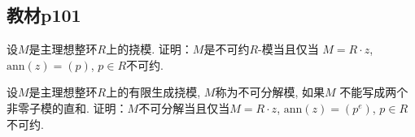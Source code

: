 \subsection{教材p101}

\begin{problem}
    设$M$是主理想整环$R$上的挠模. 证明：$M$是不可约$R$-模当且仅当
$M = R \cdot z$, $\mathrm{ann}(z) = (p)$, $p \in R$不可约.
\end{problem}

\begin{solution}
    
\end{solution}

\begin{problem}
    设$M$是主理想整环$R$上的有限生成挠模, $M$称为不可分解模, 如果$M$
不能写成两个非零子模的直和. 证明：$M$不可分解当且仅当$M = R \cdot z$,
$\mathrm{ann}(z) = (p^e)$, $p \in R$不可约.
\end{problem}

\begin{solution}
    
\end{solution}
